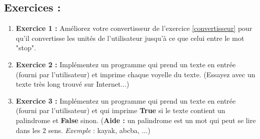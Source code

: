 \subsection{Exercices : }
\begin{enumerate}
    \item \textbf{Exercice 1 : } Améliorez votre convertisseur de l'exercice \ref{convertisseur} pour qu'il convertisse les unités de l'utilisateur jusqu'à ce que celui entre le mot "stop".  
    \item \textbf{Exercice 2 : } Implémentez un programme qui prend un texte en entrée (fourni par l'utilisateur) et imprime chaque voyelle du texte. (Essayez avec un texte très long trouvé sur Internet...)
    \item \textbf{Exercice 3 : } Implémentez un programme qui prend un texte en entrée (fourni par l'utilisateur) et qui imprime \textbf{True} si le texte contient un palindrome et \textbf{False} sinon. (\textbf{Aide :} un palindrome est un mot qui peut se lire dans les 2 sens. \textit{Exemple} : kayak, abcba, ...)
\end{enumerate}